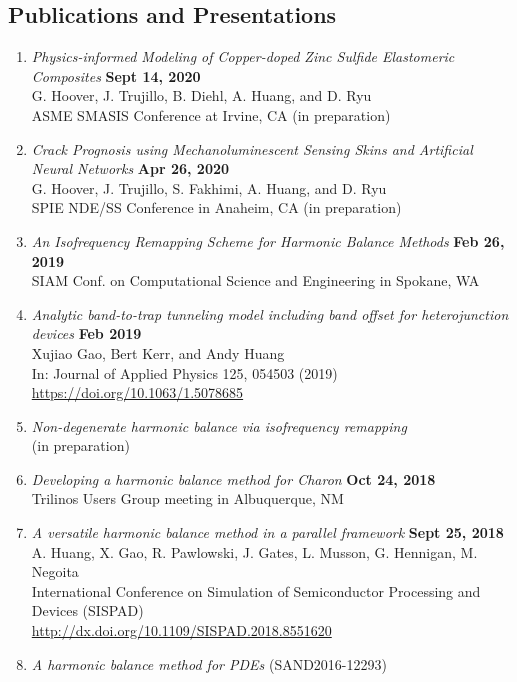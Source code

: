 \documentclass[margin,line]{res}
\begin{document}
\begin{resume}
\section{\sc Publications and Presentations}
\begin{enumerate}
\item \emph{Physics-informed Modeling of Copper-doped Zinc Sulfide Elastomeric Composites} \hfill {\bf Sept 14, 2020}\\
      G. Hoover, J. Trujillo, B. Diehl, A. Huang, and D. Ryu\\
      ASME SMASIS Conference at Irvine, CA (in preparation)
\item \emph{Crack Prognosis using Mechanoluminescent Sensing Skins and Artificial Neural Networks} \hfill {\bf Apr 26, 2020}\\
      G. Hoover, J. Trujillo, S. Fakhimi, A. Huang, and D. Ryu\\
      SPIE NDE/SS Conference in Anaheim, CA (in preparation)
\item \emph{An Isofrequency Remapping Scheme for Harmonic Balance Methods} \hfill{\bf Feb 26, 2019}\\
      SIAM Conf. on Computational Science and Engineering in Spokane, WA
\item \emph{Analytic band-to-trap tunneling model including band offset for heterojunction devices} \hfill{\bf Feb 2019}\\
      Xujiao Gao, Bert Kerr, and Andy Huang\\
      In: Journal of Applied Physics 125, 054503 (2019)\\
      \url{https://doi.org/10.1063/1.5078685}
\item \emph{Non-degenerate harmonic balance via isofrequency remapping}\\
      (in preparation)
\item \emph{Developing a harmonic balance method for Charon}  \hfill {\bf Oct 24, 2018}\\
      Trilinos Users Group meeting in Albuquerque, NM
\item \emph{A versatile harmonic balance method in a parallel framework} \hfill {\bf Sept 25, 2018}\\
      A. Huang, X. Gao, R. Pawlowski, J. Gates, L. Musson, G. Hennigan, M. Negoita\\
      International Conference on Simulation of Semiconductor Processing and Devices (SISPAD)\\
      \url{http://dx.doi.org/10.1109/SISPAD.2018.8551620}
\item \emph{A harmonic balance method for PDEs} (SAND2016-12293)

\end{enumerate}
\end{resume}
\end{document}
